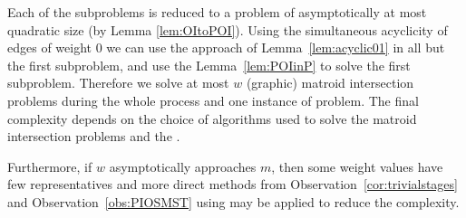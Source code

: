 Each of the \OISMST subproblems is reduced to a \POISMST problem of asymptotically at most quadratic size (by Lemma \ref{lem:OItoPOI}). Using the simultaneous acyclicity of edges of weight 0 we can use the approach of Lemma~\ref{lem:acyclic01} in all but the first subproblem, and use the Lemma~\ref{lem:POIinP} to solve the first subproblem. Therefore we solve at most $w$ (graphic) matroid intersection problems during the whole process and one instance of \SST problem. The final complexity depends on the choice of algorithms used to solve the matroid intersection problems and the \SST. 

Furthermore, if $w$ asymptotically approaches $m$, then some weight values have few representatives and more direct methods from Observation~\ref{cor:trivialstages} and Observation~\ref{obs:PIOSMST} using \SKA may be applied to reduce the complexity. 
